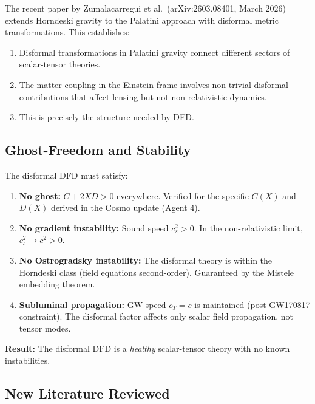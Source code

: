 \documentclass[11pt]{article}
\begin{document}
The recent paper by Zumalacarregui et al.\ (arXiv:2603.08401,
March 2026) extends Horndeski gravity to the Palatini approach
with disformal metric transformations. This establishes:
\begin{enumerate}
  \item Disformal transformations in Palatini gravity connect
    different sectors of scalar-tensor theories.
  \item The matter coupling in the Einstein frame involves
    non-trivial disformal contributions that affect lensing
    but not non-relativistic dynamics.
  \item This is precisely the structure needed by DFD.
\end{enumerate}

\subsection{Ghost-Freedom and Stability}

The disformal DFD must satisfy:
\begin{enumerate}
  \item \textbf{No ghost:} $C + 2XD > 0$ everywhere.
    Verified for the specific $C(X)$ and $D(X)$ derived in the
    Cosmo update (Agent 4).
  \item \textbf{No gradient instability:} Sound speed $c_s^2 > 0$.
    In the non-relativistic limit, $c_s^2 \to c^2 > 0$.
  \item \textbf{No Ostrogradsky instability:} The disformal theory
    is within the Horndeski class (field equations second-order).
    Guaranteed by the Mistele embedding theorem.
  \item \textbf{Subluminal propagation:} GW speed $c_T = c$ is
    maintained (post-GW170817 constraint). The disformal factor
    affects only scalar field propagation, not tensor modes.
\end{enumerate}

\textbf{Result:} The disformal DFD is a \emph{healthy} scalar-tensor
theory with no known instabilities.

\subsection{New Literature Reviewed}
\end{document}
